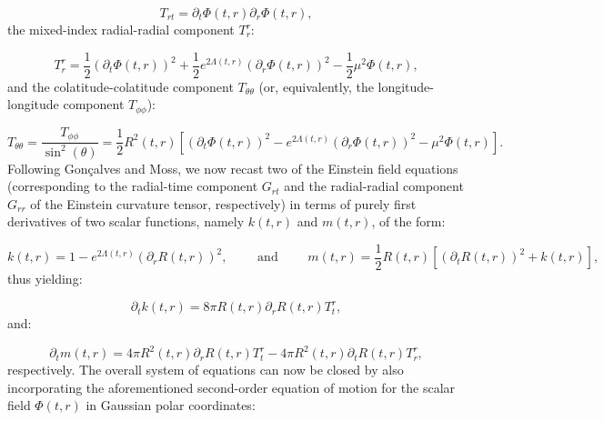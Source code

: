 \documentclass{article}
\begin{document}
\begin{equation}
T_{r t} = \partial_t \Phi \left( t, r \right) \partial_r \Phi \left( t, r \right),
\end{equation}
the mixed-index radial-radial component ${T_{r}^{r}}$:

\begin{equation}
T_{r}^{r} = \frac{1}{2} \left( \partial_t \Phi \left( t, r \right) \right)^2 + \frac{1}{2} e^{2 \Lambda \left( t, r \right)} \left( \partial_r \Phi \left( t, r \right) \right)^2 - \frac{1}{2} \mu^2 \Phi \left( t, r \right),
\end{equation}
and the colatitude-colatitude component ${T_{\theta \theta}}$ (or, equivalently, the longitude-longitude component ${T_{\phi \phi}}$):

\begin{equation}
T_{\theta \theta} = \frac{T_{\phi \phi}}{\sin^{2} \left( \theta \right)} = \frac{1}{2} R^2 \left( t, r \right) \left[ \left( \partial_t \Phi \left( t, r \right) \right)^2 - e^{2 \Lambda \left( t, r \right)} \left( \partial_r \Phi \left( t, r \right) \right)^2 - \mu^2 \Phi \left( t, r \right) \right].
\end{equation}
Following Gon\c{c}alves and Moss\cite{goncalves}, we now recast two of the Einstein field equations (corresponding to the radial-time component ${G_{r t}}$ and the radial-radial component ${G_{r r}}$ of the Einstein curvature tensor, respectively) in terms of purely first derivatives of two scalar functions, namely ${k \left( t, r \right)}$ and ${m \left( t, r \right)}$, of the form:

\begin{equation}
k \left( t, r \right) = 1 - e^{2 \Lambda \left( t, r \right)} \left( \partial_r R \left( t, r \right) \right)^2, \qquad \text{ and } \qquad m \left( t, r \right) = \frac{1}{2} R \left( t, r \right) \left[ \left( \partial_t R \left( t, r \right) \right)^2 + k \left( t, r \right) \right],
\end{equation}
thus yielding:

\begin{equation}
\partial_t k \left( t, r \right) = 8 \pi R \left( t, r \right) \partial_r R \left( t, r \right) T_{t}^{r},
\end{equation}
and:

\begin{equation}
\partial_t m \left( t, r \right) = 4 \pi R^2 \left( t, r \right) \partial_r R \left( t, r \right) T_{t}^{r} - 4 \pi R^2 \left( t, r \right) \partial_t R \left( t, r \right) T_{r}^{r},
\end{equation}
respectively. The overall system of equations can now be closed by also incorporating the aforementioned second-order equation of motion for the scalar field ${\Phi \left( t, r \right)}$ in Gaussian polar coordinates:
\end{document}
